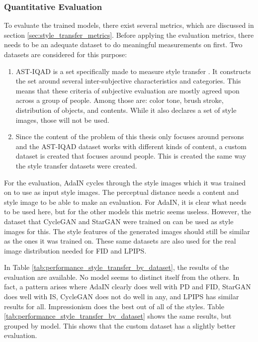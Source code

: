 \subsubsection{Quantitative Evaluation}
To evaluate the trained models, there exist several metrics, which are discussed in section \ref{sec:style_transfer_metrics}.
Before applying the evaluation metrics, there needs to be an adequate dataset to do meaningful measurements on first.
Two datasets are considered for this purpose:
\begin{enumerate}
    \item \gls{AST-IQAD} is a set specifically made to measure style transfer \cite{Chen2023}.
    It constructs the set around several inter-subjective characteristics and categories.
    This means that these criteria of subjective evaluation are mostly agreed upon across a group of people.
    Among those are: color tone, brush stroke, distribution of objects, and contents.
    While it also declares a set of style images, those will not be used.
    \item Since the content of the problem of this thesis only focuses around persons and the \gls{AST-IQAD} dataset works with different kinds of content, a custom dataset is created that focuses around people.
    This is created the same way the style transfer datasets were created.
\end{enumerate}
For the evaluation, AdaIN cycles through the style images which it was trained on to use as input style images.
The perceptual distance needs a content and style image to be able to make an evaluation.
For AdaIN, it is clear what needs to be used here, but for the other models this metric seems useless.
However, the dataset that CycleGAN and StarGAN were trained on can be used as style images for this.
The style features of the generated images should still be similar as the ones it was trained on.
These same datasets are also used for the real image distribution needed for \gls{FID} and \gls{LPIPS}.

In Table \ref{tab:performance_style_transfer_by_dataset}, the results of the evaluation are available.
No model seems to distinct itself from the others.
In fact, a pattern arises where AdaIN clearly does well with \gls{PD} and {FID}, StarGAN does well with \gls{IS}, CycleGAN does not do well in any, and \gls{LPIPS} has similar results for all.
Impressionism does the best out of all of the styles.
Table \ref{tab:performance_style_transfer_by_dataset} shows the same results, but grouped by model.
This shows that the custom dataset has a slightly better evaluation.

